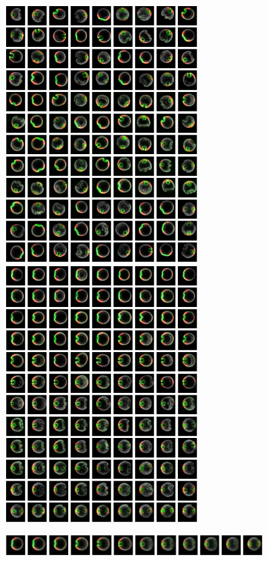 \documentclass{pnastwo}
\begin{document}
\begin{article}
\newpage
\begin{figure}[t]
\includegraphics[width=8.4cm]{raw_data2}
\hfill
{}
\includegraphics[width=8.4cm]{VDM_ordered} 

\vspace{0.2cm}
\centering
{}
\includegraphics[width=16.8cm]{average_trajectory}


\end{figure}
\end{article}
\end{document}
